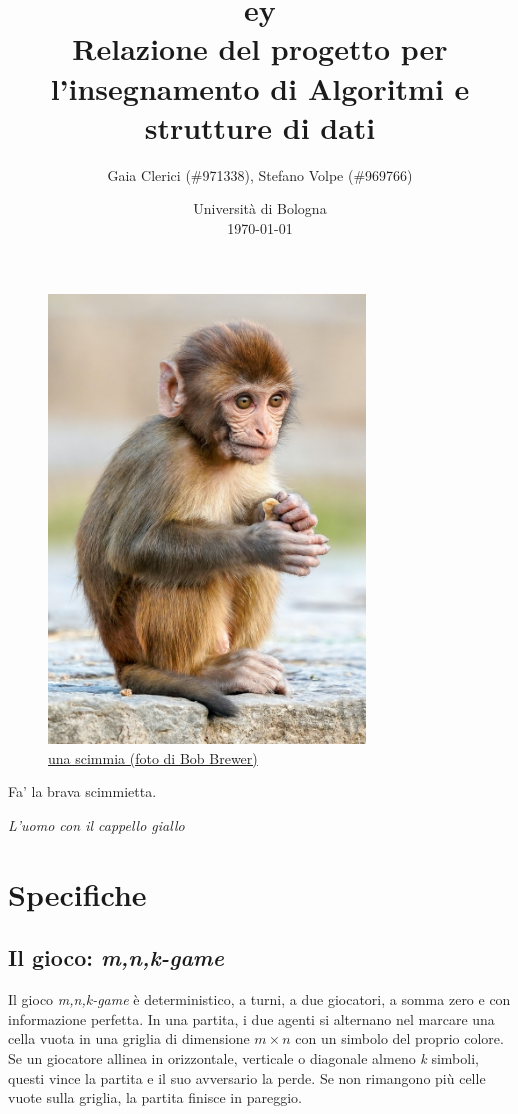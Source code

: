 \documentclass{article}
\title{
  {
    \fontspec[ Path = fonts/ ]{Symbola}
    \symbol{"1F17C}\symbol{"1F435}\symbol{"1F17D}\symbol{"1F17A}ey
  } \large \\
  \small Relazione del progetto per l'insegnamento di Algoritmi e strutture di
  dati
}
\author{
  Gaia Clerici (\#971338),
  Stefano Volpe (\#969766)
}
\date{
	Universit\`a di Bologna \\
  \today
}
\begin{document}
\maketitle
\thispagestyle{empty}

\begin{figure}[h]
  \includegraphics[width=0.75\textwidth]{monkey}
  \centering
  \caption{\href{https://unsplash.com/photos/daC7ji1EMHM}{una scimmia (foto di
  Bob Brewer)}}
\end{figure}

\pagebreak

\epigraph{Fa' la brava scimmietta.}{\textit{L'uomo con il cappello giallo}}

\tableofcontents

\pagebreak

\section{Specifiche}

\subsection{Il gioco: \emph{m,n,k-game}}

Il gioco \emph{m,n,k-game} è deterministico, a turni, a due giocatori, a somma
zero e con informazione perfetta. In una partita, i due agenti si alternano nel
marcare una cella vuota in una griglia di dimensione $m\times n$ con un simbolo
del proprio colore. Se un giocatore allinea in orizzontale, verticale o
diagonale almeno \emph{k} simboli, questi vince la partita e il suo avversario
la perde. Se non rimangono più celle vuote sulla griglia, la partita finisce
in pareggio.
\end{document}
